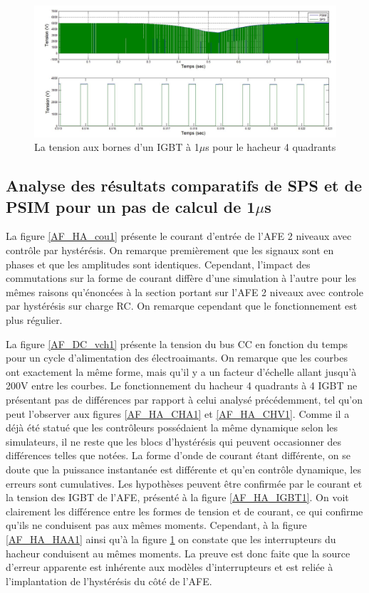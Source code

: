 \begin{figure}[htb]
\centering
\includegraphics[scale=0.5]{fig/Hach_AFE/1u/IGBT_ten_hach.jpg}
\caption{La tension aux bornes d'un IGBT à 1$\mu$s pour le hacheur 4 quadrants}
\label{AF_HA_HAV1}
\end{figure}



\clearpage

\subsection{Analyse des résultats comparatifs de SPS et de PSIM pour un pas de calcul de 1$\mu$s}

La figure \ref{AF_HA_cou1} présente le courant d'entrée de l'AFE 2 niveaux avec contrôle par hystérésis. On remarque premièrement que les signaux sont en phases et que les amplitudes sont identiques. Cependant, l'impact des commutations sur la forme de courant diffère d'une simulation à l'autre pour les mêmes raisons qu'énoncées à la section portant sur l'AFE 2 niveaux avec controle par hystérésis sur charge RC. On remarque cependant que le fonctionnement est plus régulier.

La figure \ref{AF_DC_vch1} présente la tension du bus CC en fonction du temps pour un cycle d'alimentation des électroaimants. On remarque que les courbes ont exactement la même forme, mais qu'il y a un facteur d'échelle allant jusqu'à 200V entre les courbes. Le fonctionnement du hacheur 4 quadrants à 4 IGBT ne présentant pas de différences par rapport à celui analysé précédemment, tel qu'on peut l'observer aux figures \ref{AF_HA_CHA1} et \ref{AF_HA_CHV1}. Comme il a déjà été statué que les contrôleurs possédaient la même dynamique selon les simulateurs, il ne reste que les blocs d'hystérésis qui peuvent occasionner des différences telles que notées. La forme d'onde de courant étant différente, on se doute que la puissance instantanée est différente et qu'en contrôle dynamique, les erreurs sont cumulatives. Les hypothèses peuvent être confirmée par le courant et la tension des IGBT de l'AFE, présenté à la figure \ref{AF_HA_IGBT1}. On voit clairement les différence entre les formes de tension et de courant, ce qui confirme qu'ils ne conduisent pas aux mêmes moments. Cependant, à la figure \ref{AF_HA_HAA1} ainsi qu'à la figure \ref{AF_HA_HAV1} on constate que les interrupteurs du hacheur conduisent au mêmes moments. La preuve est donc faite que la source d'erreur apparente est inhérente aux modèles d'interrupteurs et est reliée à l'implantation de l'hystérésis du côté de l'AFE. 

